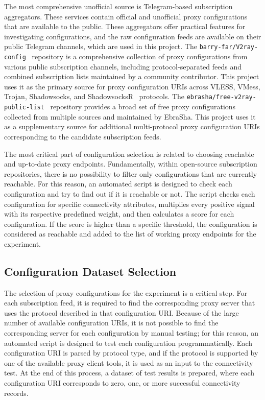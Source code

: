 \documentclass[10pt,conference]{IEEEtran}
\begin{document}
The most comprehensive unofficial source is Telegram-based subscription aggregators.
These services contain official and unofficial proxy configurations that are available to the public.
These aggregators offer practical features for investigating configurations, and the raw configuration feeds are available on their public Telegram channels, which are used in this project.
The \texttt{barry-far/V2ray-config}~\cite{barry_far_v2ray} repository is a comprehensive collection of proxy configurations from various public subscription channels, including protocol-separated feeds and combined subscription lists maintained by a community contributor.
This project uses it as the primary source for proxy configuration URIs across VLESS, VMess, Trojan, Shadowsocks, and ShadowsocksR~\cite{shadowsocksr} protocols.
The \texttt{ebrasha/free-v2ray-public-list}~\cite{ebrasha_v2ray} repository provides a broad set of free proxy configurations collected from multiple sources and maintained by EbraSha.
This project uses it as a supplementary source for additional multi-protocol proxy configuration URIs corresponding to the candidate subscription feeds.

The most critical part of configuration selection is related to choosing reachable and up-to-date proxy endpoints.
Fundamentally, within open-source subscription repositories, there is no possibility to filter only configurations that are currently reachable.
For this reason, an automated script is designed to check each configuration and try to find out if it is reachable or not.
The script checks each configuration for specific connectivity attributes, multiplies every positive signal with its respective predefined weight, and then calculates a score for each configuration.
If the score is higher than a specific threshold, the configuration is considered as reachable and added to the list of working proxy endpoints for the experiment.

\subsection{Configuration Dataset Selection}
The selection of proxy configurations for the experiment is a critical step.
For each subscription feed, it is required to find the corresponding proxy server that uses the protocol described in that configuration URI.
Because of the large number of available configuration URIs, it is not possible to find the corresponding server for each configuration by manual testing; for this reason, an automated script is designed to test each configuration programmatically.
Each configuration URI is parsed by protocol type, and if the protocol is supported by one of the available proxy client tools, it is used as an input to the connectivity test.
At the end of this process, a dataset of test results is prepared, where each configuration URI corresponds to zero, one, or more successful connectivity records.
\end{document}
